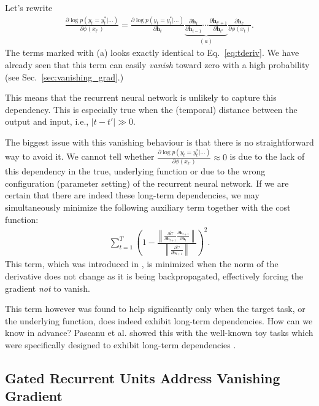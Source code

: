 \documentclass{report}
\newcommand{\vect}[1]{\mathbf{#1}}
\newcommand{\vh}[0]{\vect{h}}
\begin{document}
Let's rewrite 
\begin{align*}
    \frac{\partial \log p(y_t=y_t^*|\ldots)}{\partial \phi(x_{t'})} 
    = \frac{\partial \log p(y_t=y_t^*|\ldots)}{\partial \vh_t}
    \underbrace{
        \frac{\partial \vh_t}{\partial \vh_{t-1}} \cdots
        \frac{\partial \vh_{t'+1}}{\partial \vh_{t'}} 
    }_{(a)}
    \frac{\partial \vh_{t'}}{\partial \phi(x_t)}.
\end{align*}
The terms marked with (a) looks exactly identical to Eq.~\eqref{eq:tderiv}. We
have already seen that this term can easily {\em vanish} toward zero with a high
probability (see Sec.~\ref{sec:vanishing_grad}.)

This means that the recurrent neural network is unlikely to capture this
dependency. This is especially true when the (temporal) distance between the
output and input, i.e., $|t - t'| \gg 0$.

The biggest issue with this vanishing behaviour is that there is no
straightforward way to avoid it. We cannot tell whether $\frac{\partial \log
p(y_t=y_t^*|\ldots)}{\partial \phi(x_{t'})} \approx 0$ is due to the lack of
this dependency in the true, underlying function or due to the wrong
configuration (parameter setting) of the recurrent neural network. If we are
certain that there are indeed these long-term dependencies, we may
simultaneously minimize the following auxiliary term together with the cost
function:
\begin{align*}
    \sum_{t=1}^T \left( 1 - \frac{\left\| 
            \frac{\partial \tilde{C}}{\partial \vh_{t+1}}
            \frac{\partial \vh_{t+1}}{\partial \vh_t}
    \right\|}{\left\| 
        \frac{\partial \tilde{C}}{\partial \vh_{t+1}}
\right\|} \right)^2.
\end{align*}
This term, which was introduced in \cite{pascanu2013difficulty}, is minimized
when the norm of the derivative does not change as it is being backpropagated,
effectively forcing the gradient {\em not} to vanish.

This term however was found to help significantly only when the target task, or
the underlying function, does indeed exhibit long-term dependencies. How can we
know in advance? Pascanu et al. \cite{pascanu2013difficulty} showed this with
the well-known toy tasks which were specifically designed to exhibit long-term
dependencies \cite{hochreiter2001gradient}.


\subsection{Gated Recurrent Units Address Vanishing Gradient}
\end{document}
